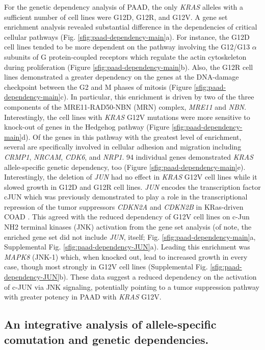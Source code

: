 \documentclass[english, 12pt, letterpaper]{article}
\newcommand{\KRAS}{\emph{KRAS}}
\newcommand{\kras}{KRas}
\begin{document}
For the genetic dependency analysis of PAAD, the only \KRAS{} alleles with a sufficient number of cell lines were G12D, G12R, and G12V.
A gene set enrichment analysis revealed substantial difference in the dependencies of critical cellular pathways (Fig. \ref{sfig:paad-dependency-main}a).
For instance, the G12D cell lines tended to be more dependent on the pathway involving the G12/G13 $\alpha$ subunits of G protein-coupled receptors which regulate the actin cytoskeleton during proliferation \cite{Worzfeld2008G12/G13-mediatedDisease., Siehler2009RegulationReceptors., Suzuki2009RegulationPathways.} (Figure \ref{sfig:paad-dependency-main}b).
Also, the G12R cell lines demonstrated a greater dependency on the genes at the DNA-damage checkpoint between the G2 and M phases of mitosis (Figure \ref{sfig:paad-dependency-main}c).
In particular, this enrichment is driven by two of the three components of the MRE11-RAD50-NBN (MRN) complex, \emph{MRE11} and \emph{NBN}.
Interestingly, the cell lines with \KRAS{} G12V mutations were more sensitive to knock-out of genes in the Hedgehog pathway (Figure \ref{sfig:paad-dependency-main}d).
Of the genes in this pathway with the greatest level of enrichment, several are specifically involved in cellular adhesion and migration including \emph{CRMP1}, \emph{NRCAM}, \emph{CDK6}, and \emph{NRP1}.
94 individual genes demonstrated \KRAS{} allele-specific genetic dependency, too (Figure \ref{sfig:paad-dependency-main}e).
Interestingly, the deletion of \emph{JUN} had no effect in \KRAS{} G12V cell lines while it slowed growth in G12D and G12R cell lines.
\emph{JUN} encodes the transcription factor cJUN which was previously demonstrated to play a role in the transcriptional repression of the tumor suppressors \emph{CDKN2A} and \emph{CDKN2B} in \kras{}-driven COAD \cite{Serra2014APhenotype.}.
This agreed with the reduced dependency of G12V cell lines on c-Jun NH2 terminal kinases (JNK) activation from the gene set analysis (of note, the enriched gene set did not include \emph{JUN}, itself; Fig. \ref{sfig:paad-dependency-main}a, Supplemental Fig. \ref{sfig:paad-dependency-JUN}a).
Leading this enrichment was \emph{MAPK8} (JNK-1) which, when knocked out, lead to increased growth in every case, though most strongly in G12V cell lines (Supplemental Fig. \ref{sfig:paad-dependency-JUN}b).
These data suggest a reduced dependency on the activation of c-JUN via JNK signaling, potentially pointing to a tumor suppression pathway with greater potency in PAAD with \KRAS{} G12V.


\subsection*{An integrative analysis of allele-specific comutation and genetic dependencies.}
\end{document}
